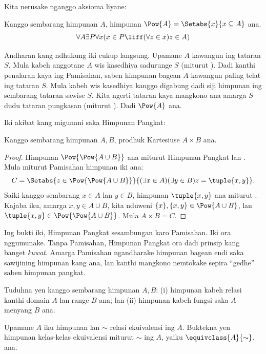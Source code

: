 \documentclass[../../../include/open-logic-section]{subfiles}
\begin{document}

Kita nerusake nganggo aksioma liyane:

\begin{axiom}
Kanggo sembarang himpunan $A$, himpunan
$\Pow{A} = \Setabs{x}{x \subseteq A}$ ana.
\[
	\forall A \exists P \forall x(x \in P \liff (\forall z \in x)z \in A)
\]
\end{axiom}

Andharan kang ndhukung iki cukup langsung. Upamane $A$
kawangun ing tataran $S$. Mula kabeh anggotane $A$ wis
kasedhiya sadurunge $S$ (miturut \stagesacc). Dadi kanthi
penalaran kaya ing Pamisahan, saben himpunan bagean $A$
kawangun paling telat ing tataran $S$. Mula kabeh wis
kasedhiya kanggo digabung dadi siji himpunan ing sembarang
tataran sawise $S$. Kita ngerti tataran kaya mangkono ana
amarga $S$ dudu tataran pungkasan (miturut \stagessucc).
Dadi $\Pow{A}$ ana.

Iki akibat kang migunani saka Himpunan Pangkat:

\begin{prop}\label{thm:Products}
Kanggo sembarang himpunan $A, B$, prodhuk Kartesiuse
$A \times B$ ana.
\end{prop}

\begin{proof}
Himpunan $\Pow{\Pow{A \cup B}}$ ana miturut Himpunan Pangkat
lan . Mula
miturut Pamisahan himpunan iki ana:
\[
	C = \Setabs{z \in \Pow{\Pow{A \cup B}}}{(\exists x \in A)(\exists y \in B) z = \tuple{x, y}}.
\]
Saiki kanggo sembarang $x \in A$ lan $y \in B$,
himpunan $\tuple{x, y}$ ana miturut
. Kajaba iku,
amarga $x, y \in A \cup B$, kita nduweni
$\{x\}, \{x, y\} \in \Pow{A \cup B}$, lan
$\tuple{x,y} \in \Pow{\Pow{A \cup B}}$. Mula $A \times B = C$.
\end{proof}

Ing bukti iki, Himpunan Pangkat sesambungan karo Pamisahan.
Iki ora nggumunake. Tanpa Pamisahan, Himpunan Pangkat ora
dadi prinsip kang banget \emph{kuwat}. Amarga Pamisahan
ngandharake himpunan bagean endi saka sawijining himpunan
kang ana, lan kanthi mangkono nemtokake sepira ``gedhe''
saben himpunan pangkat.

\begin{prob}
Tuduhna yen kanggo sembarang himpunan $A, B$: (i) himpunan
kabeh relasi kanthi domain $A$ lan range $B$ ana; lan
(ii) himpunan kabeh fungsi saka $A$ menyang $B$ ana.
\end{prob}

\begin{prob}
Upamane $A$ iku himpunan lan $\sim$ relasi ekuivalensi ing $A$.
Buktekna yen himpunan kelas-kelas ekuivalensi miturut $\sim$
ing $A$, yaiku $\equivclass{A}{\sim}$, ana.
\end{prob}
\end{document}
